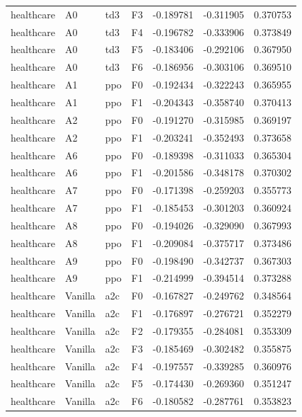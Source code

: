 \begin{tabular}{llllrrr}
healthcare &      A0 &       td3 &  F3 & -0.189781 & -0.311905 &  0.370753 \\
healthcare &      A0 &       td3 &  F4 & -0.196782 & -0.333906 &  0.373849 \\
healthcare &      A0 &       td3 &  F5 & -0.183406 & -0.292106 &  0.367950 \\
healthcare &      A0 &       td3 &  F6 & -0.186956 & -0.303106 &  0.369510 \\
healthcare &      A1 &       ppo &  F0 & -0.192434 & -0.322243 &  0.365955 \\
healthcare &      A1 &       ppo &  F1 & -0.204343 & -0.358740 &  0.370413 \\
healthcare &      A2 &       ppo &  F0 & -0.191270 & -0.315985 &  0.369197 \\
healthcare &      A2 &       ppo &  F1 & -0.203241 & -0.352493 &  0.373658 \\
healthcare &      A6 &       ppo &  F0 & -0.189398 & -0.311033 &  0.365304 \\
healthcare &      A6 &       ppo &  F1 & -0.201586 & -0.348178 &  0.370302 \\
healthcare &      A7 &       ppo &  F0 & -0.171398 & -0.259203 &  0.355773 \\
healthcare &      A7 &       ppo &  F1 & -0.185453 & -0.301203 &  0.360924 \\
healthcare &      A8 &       ppo &  F0 & -0.194026 & -0.329090 &  0.367993 \\
healthcare &      A8 &       ppo &  F1 & -0.209084 & -0.375717 &  0.373486 \\
healthcare &      A9 &       ppo &  F0 & -0.198490 & -0.342737 &  0.367303 \\
healthcare &      A9 &       ppo &  F1 & -0.214999 & -0.394514 &  0.373288 \\
healthcare & Vanilla &       a2c &  F0 & -0.167827 & -0.249762 &  0.348564 \\
healthcare & Vanilla &       a2c &  F1 & -0.176897 & -0.276721 &  0.352279 \\
healthcare & Vanilla &       a2c &  F2 & -0.179355 & -0.284081 &  0.353309 \\
healthcare & Vanilla &       a2c &  F3 & -0.185469 & -0.302482 &  0.355875 \\
healthcare & Vanilla &       a2c &  F4 & -0.197557 & -0.339285 &  0.360976 \\
healthcare & Vanilla &       a2c &  F5 & -0.174430 & -0.269360 &  0.351247 \\
healthcare & Vanilla &       a2c &  F6 & -0.180582 & -0.287761 &  0.353823 \\

\end{tabular}
